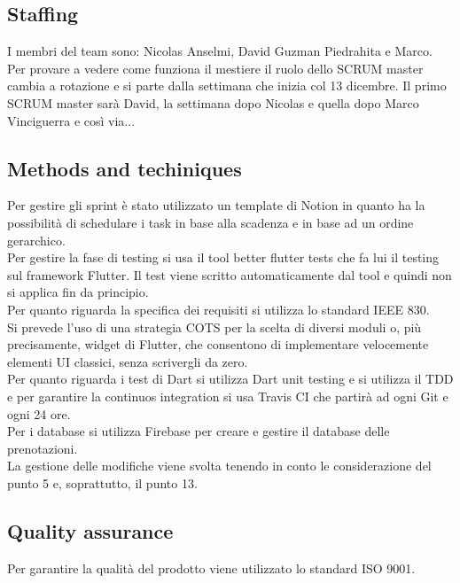 \documentclass{article}
\begin{document}
\subsection{Staffing}
I membri del team sono: Nicolas Anselmi, David Guzman Piedrahita e Marco.
\\Per provare a vedere come funziona il mestiere il ruolo dello SCRUM master cambia a rotazione e si parte dalla settimana 
che inizia col 13 dicembre. Il primo SCRUM master sarà David, la settimana dopo Nicolas e quella dopo Marco Vinciguerra e così via...

\subsection{Methods and techiniques}
Per gestire gli sprint è stato utilizzato un template di Notion in quanto ha la possibilità di schedulare i task in base alla scadenza e in base ad un ordine gerarchico.
\\Per gestire la fase di testing si usa il tool better flutter tests che fa lui il testing sul framework Flutter. Il test viene scritto automaticamente dal tool e quindi 
non si applica fin da principio.
\\Per quanto riguarda la specifica dei requisiti si utilizza lo standard IEEE 830.
\\Si prevede l'uso di una strategia COTS per la scelta di diversi moduli o, più precisamente, widget di Flutter, che consentono di implementare velocemente
elementi UI classici, senza scrivergli da zero.
\\Per quanto riguarda i test di Dart si utilizza Dart unit testing e si utilizza il TDD e per garantire la continuos integration si usa Travis CI che partirà ad ogni 
Git e ogni 24 ore.
\\Per i database si utilizza Firebase  per creare e gestire il database delle prenotazioni.
\\La gestione delle modifiche viene svolta tenendo in conto le considerazione del punto 5 e, soprattutto, il punto 13.
\subsection{Quality assurance}
Per garantire la qualità del prodotto viene utilizzato lo standard ISO 9001.
\end{document}
